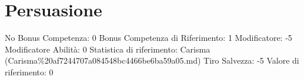 \section{Persuasione}\label{persuasione}

\begin{description}
\tightlist
\item[Tags: ABI]
No Bonus Competenza: 0 Bonus Competenza di Riferimento: 1 Modificatore:
-5 Modificatore Abilità: 0 Statistica di riferimento: Carisma
(Carisma\%20af7244707a084548bc4466be6ba59a05.md) Tiro Salvezza: -5
Valore di riferimento: 0
\end{description}
